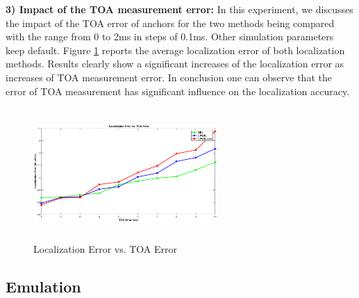 \textbf{3) Impact of the TOA measurement error:}
In this experiment, we discusses the impact of the TOA error of anchors for the two methods being compared with the range from 0 to 2ms in steps of 0.1ms. 
Other simulation parameters keep default. 
Figure \ref{fig6} reports the average localization error of both localization methods. 
Results clearly show a significant increases of the localization error as increases of TOA measurement error.
In conclusion one can observe that the error of TOA measurement has significant influence on the localization accuracy. 
  \begin{figure}[htb]       
            \centering
			\vspace{-3mm}
            \includegraphics[height=5.0cm,width=7.0cm]{image/TOA.eps}
                \caption{Localization Error vs. TOA Error}
             \vspace{-8mm}
             \label{fig6}
        \end{figure}
\subsection{Emulation}


